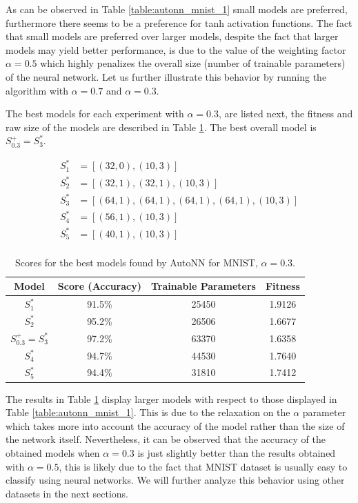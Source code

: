 \documentclass[journal]{IEEEtran}
\begin{document}
As can be observed in Table \ref{table:autonn_mnist_1} small models are preferred, furthermore there seems to be a preference for tanh activation functions. The fact that small models are preferred over larger models, despite the fact that larger models may yield better performance, is due to the value of the weighting factor $\alpha = 0.5$ which highly penalizes the overall size (number of trainable parameters) of the neural network.  Let us further illustrate this behavior by running the algorithm with $\alpha = 0.7$ and $\alpha = 0.3$.

The best models for each experiment with $\alpha = 0.3$, are listed next, the fitness and raw size of the models are described in Table \ref{table:autonn_mnist_2}. The best overall model is $S^+_{0.3} = S^*_3$.

\begin{align*}
S^*_1 & = \left[ (32, 0), (10, 3) \right] \\
S^*_2 & = \left[ (32, 1), (32, 1), (10, 3) \right] \\
S^*_3 & = \left[ (64, 1), (64, 1), (64, 1), (64, 1), (10, 3) \right] \\
S^*_4 & = \left[ (56, 1),  (10, 3) \right] \\
S^*_5 & = \left[ (40, 1), (10, 3) \right] \\
\end{align*}

\begin{table}[!htb]
\begin{center}
\begin{tabular}{| c | c | c | c |}
\hline
Model & Score (Accuracy) & Trainable Parameters & Fitness\\
\hline
$S^*_1$ & 91.5\% & 25450 & 1.9126\\
$S^*_2$ & 95.2\% & 26506 & 1.6677\\
$S^+_{0.3} = S^*_3$ & 97.2\% & 63370 & 1.6358\\
$S^*_4$ & 94.7\% & 44530 & 1.7640\\
$S^*_5$ & 94.4\% & 31810 & 1.7412\\
\hline
\end{tabular}
\end{center}
\caption{Scores for the best models found by AutoNN for MNIST, $\alpha = 0.3$.}
\label{table:autonn_mnist_2}
\end{table}

The results in Table \ref{table:autonn_mnist_2} display larger models with respect to those displayed in Table \ref{table:autonn_mnist_1}. This is due to the relaxation on the $\alpha$ parameter which takes more into account the accuracy of the model rather than the size of the network itself. Nevertheless, it can be observed that the accuracy of the obtained models when $\alpha=0.3$ is just slightly better than the results obtained with $\alpha=0.5$, this is likely due to the fact that MNIST dataset is usually easy to classify using neural networks. We will further analyze this behavior using other datasets in the next sections.
\end{document}
